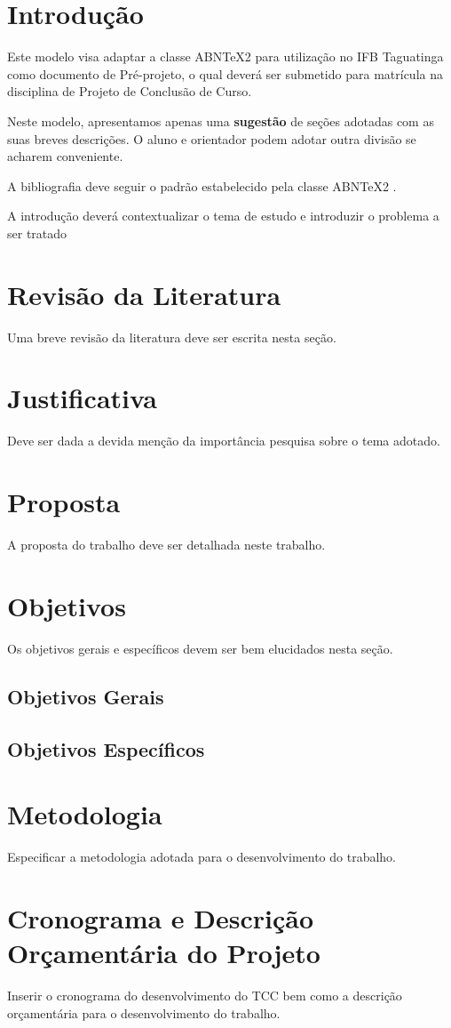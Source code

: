 \documentclass[licenciatura]{pre-projeto-computacao}
\begin{document}
\frenchspacing 
\imprimircapa
\imprimirfolhaderosto



\section*{Introdução}
	Este modelo visa adaptar a classe ABNTeX2 para utilização no IFB Taguatinga como documento de Pré-projeto, o qual deverá ser submetido para matrícula na disciplina de Projeto de Conclusão de Curso.
	
	Neste modelo, apresentamos apenas uma \textbf{sugestão} de seções adotadas com as suas breves descrições. O aluno e orientador podem adotar outra divisão se acharem conveniente.
	
	A bibliografia deve seguir o padrão estabelecido pela classe ABNTeX2 \cite{abntex2modelo-relatorio}.
	
	A introdução deverá contextualizar o tema de estudo e introduzir o problema a ser tratado

\section*{Revisão da Literatura}
	Uma breve revisão da literatura deve ser escrita nesta seção.

\section*{Justificativa}
	Deve ser dada a devida menção da importância pesquisa sobre o tema adotado.	
	
\section*{Proposta}
	A proposta do trabalho deve ser detalhada neste trabalho.

\section*{Objetivos}
	Os objetivos gerais e específicos devem ser bem elucidados nesta seção.
\subsection*{Objetivos Gerais}
\subsection*{Objetivos Específicos}

\section*{Metodologia}
	Especificar a metodologia adotada para o desenvolvimento do trabalho.

\section*{Cronograma e Descrição Orçamentária do Projeto}
	Inserir o cronograma do desenvolvimento do TCC bem como a descrição orçamentária para o desenvolvimento do trabalho.


\end{document}
